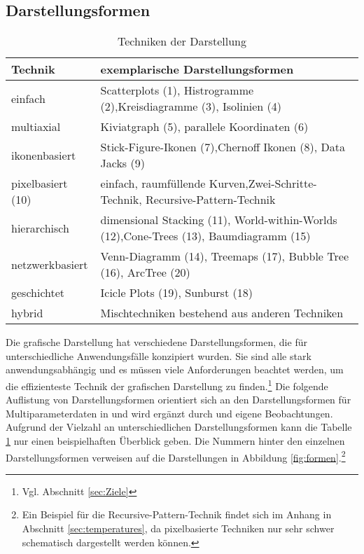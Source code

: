 \documentclass[a4paper, 
               12pt,
               DIV=calc,
               version=first,
               pdftex,
               headsepline,
               footsepline,
               bibtotocnumbered,
               liststotocnumbered]{scrreprt}
\begin{document}
\subsection{Darstellungsformen}
\label{sec:Darstellungsformen}
\begin{table}
\centering
\begin{tabular}{|l|p{10cm}|}
\hline
\textbf{Technik} & \textbf{exemplarische Darstellungsformen}\\
\hline
einfach & Scatterplots (1), Histrogramme (2),Kreisdiagramme (3), Isolinien (4)\\
\hline
multiaxial & Kiviatgraph (5), parallele Koordinaten (6)\\
\hline
ikonenbasiert & Stick-Figure-Ikonen (7),Chernoff Ikonen (8), Data Jacks (9)\\
\hline
pixelbasiert (10) &
einfach, raumfüllende Kurven,Zwei-Schritte-Technik, Recursive-Pattern-Technik\\
\hline
hierarchisch & dimensional Stacking (11), World-within-Worlds (12),Cone-Trees (13), Baumdiagramm (15)\\
\hline
netzwerkbasiert & Venn-Diagramm (14), Treemaps (17), Bubble Tree (16), ArcTree (20)\\
\hline
geschichtet & Icicle Plots (19), Sunburst (18)\\
\hline
hybrid & Mischtechniken bestehend aus anderen Techniken\\
\hline
\end{tabular}
\caption{Techniken der Darstellung}
\label{tab:darstellungsformen}
\end{table}

Die grafische Darstellung hat verschiedene Darstellungsformen, die für unterschiedliche
Anwendungsfälle konzipiert wurden. Sie sind alle stark anwendungsabhängig und es müssen viele
Anforderungen beachtet werden, um die effizienteste Technik der grafischen Darstellung zu
finden.\footnote{Vgl. Abschnitt \ref{sec:Ziele}}
Die folgende Auflistung von Darstellungsformen orientiert sich an den Darstellungsformen für
Multiparameterdaten in \citep[S.\,213]{Schumann} und
wird ergänzt durch \citep{Preim} und eigene Beobachtungen. Aufgrund der Vielzahl an unterschiedlichen
Darstellungsformen kann die Tabelle \ref{tab:darstellungsformen} nur einen beispielhaften Überblick geben. Die
Nummern hinter den einzelnen Darstellungsformen verweisen auf die Darstellungen in 
Abbildung \ref{fig:formen}.\footnote{Ein Beispiel für die Recursive-Pattern-Technik
findet sich im Anhang in Abschnitt \ref{sec:temperatures}, da pixelbasierte
Techniken nur sehr schwer schematisch dargestellt werden können.}
\end{document}
